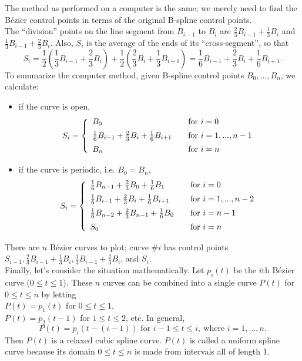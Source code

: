 \documentclass[]{usiinfbachelorproject}
\begin{document}
The method as performed on a computer is the same; we merely need to find the B\'ezier control points in terms of the original B-spline control points.\\
The ``division'' points on the line segment from $B_{i-1}$ to $B_i$ are $\frac{2}{3}B_{i-1} + \frac{1}{3}B_i$ and $\frac{1}{3}B_{i-1} + \frac{2}{3}B_i$. Also, $S_i$ is the average of the ends of its ``cross-segment'', so that
$$S_i = \frac{1}{2}(\frac{1}{3}B_{i-1} + \frac{2}{3}B_i ) + \frac{1}{2}(\frac{2}{3}B_i + \frac{1}{3}B_{i+1}) = \frac{1}{6}B_{i-1} + \frac{2}{3}B_i + \frac{1}{6}B_{i+1}.$$
To summarize the computer method, given B-spline control points $B_0, ..., B_n$, we calculate:
\begin{itemize}
	\item if the curve is open, 
	\[S_i = \left\{ 
	\begin{array}{l l}
		B_0 & \quad \text{for } i = 0\\ [0.5em]
		\frac{1}{6}B_{i-1} + \frac{2}{3}B_{i} + \frac{1}{6}B_{i+1} & \quad \text{for } i = 1, ...,n - 1\\ [0.5em]
		B_n & \quad \text{for } i = n
	\end{array}\right.\]
	\item if the curve is periodic, i.e. $B_0=B_n$,
	\[S_i = \left\{ 
	\begin{array}{l l}
		\frac{1}{6}B_{n-1} + \frac{2}{3}B_0 + \frac{1}{6}B_1 & \quad \text{for } i = 0\\ [0.5em]
		\frac{1}{6}B_{i-1} + \frac{2}{3}B_{i} + \frac{1}{6}B_{i+1} & \quad \text{for } i = 1, ...,n - 2\\ [0.5em]
		\frac{1}{6}B_{n-2} + \frac{2}{3}B_{n-1} + \frac{1}{6}B_0 & \quad \text{for } i = n-1\\ [0.5em]
		S_0 & \quad \text{for } i = n
	\end{array}\right.\]
\end{itemize}
There are $n$ B\'ezier curves to plot; curve $\#i$ has control points $S_{i-1}, \frac{2}{3}B_{i-1} + \frac{1}{3}B_{i}, \frac{1}{3}B_{i-1} + \frac{2}{3}B_{i}$, and $S_i$. \\
Finally, let's consider the situation mathematically. Let $p_i(t)$ be the $i$th B\'ezier curve ($0 \le t \le 1$). These $n$ curves can be combined into a single curve $P(t)$ for $0 \le t \le n$ by letting\\
$P(t) = p_1(t)$ for $0 \le t \le 1$,\\
$P(t) = p_2(t - 1)$ for $1 \le t \le 2$, etc. In general,
$$P(t)=p_i(t-(i-1)) \text{ for } i-1 \le t \le i,~ \text{where } i= 1,...,n.$$
Then $P(t)$ is a relaxed cubic spline curve. $P(t)$ is called a uniform spline curve because its domain $0 \le t \le n$ is made from intervals all of length 1.\\
\end{document}
